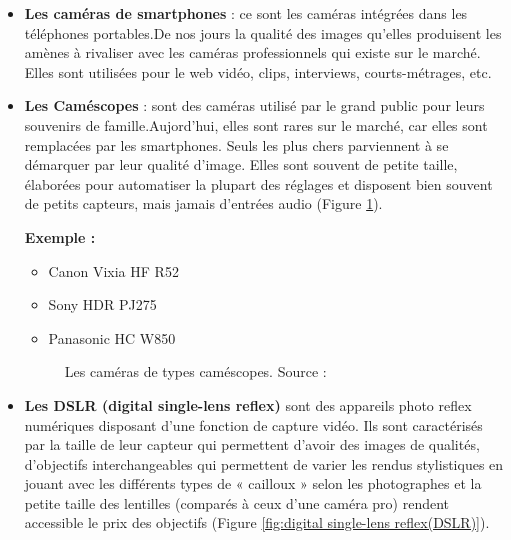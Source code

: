 \begin{itemize}
 	\item \textbf{Les caméras de smartphones} : ce sont les caméras intégrées dans les téléphones portables.De nos jours la qualité des images qu'elles produisent les amènes à rivaliser avec les caméras professionnels qui existe sur le marché. Elles sont utilisées pour le web vidéo, clips, interviews, courts-métrages, etc.
 	
 	\item \textbf{Les Caméscopes} : sont des caméras utilisé par le grand public pour leurs souvenirs de famille.Aujord'hui, elles sont rares sur le marché, car elles sont remplacées par les smartphones. Seuls les plus chers parviennent à se démarquer par leur qualité d’image. Elles sont souvent de petite taille, élaborées pour automatiser la plupart des réglages et disposent bien souvent de petits capteurs, mais jamais d’entrées audio (Figure \ref{fig:Cmescopes}).
 	
 	\textbf{Exemple :}
 	
 	\begin{itemize}
 		\item Canon Vixia HF R52
 		\item Sony HDR PJ275
 		\item Panasonic HC W850
 	\end{itemize}
 	
 	\begin{figure}[H]%
 		\center%
 		\setlength{\fboxsep}{5pt}%
 		\setlength{\fboxrule}{0.5pt}%
 		\caption[Camescopes]{Les caméras de types caméscopes. Source :\cite{noauthor_les_2015}}%
 		\label{fig:Cmescopes}
 	\end{figure}
 	
 	\item \textbf{Les DSLR (digital single-lens reflex)} sont des appareils photo reflex numériques disposant d’une fonction de capture vidéo. Ils sont caractérisés par la taille de leur capteur qui permettent d'avoir des images de qualités, d’objectifs interchangeables qui permettent de varier les rendus stylistiques en jouant avec les différents types de « cailloux » selon les photographes et la petite taille des lentilles (comparés à ceux d’une caméra pro) rendent accessible le prix des objectifs (Figure \ref{fig:digital single-lens reflex(DSLR)}).
 	

\end{itemize}
